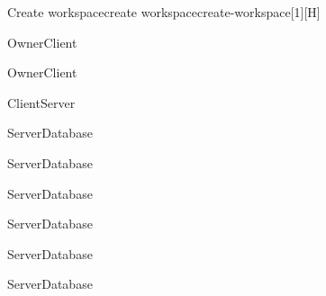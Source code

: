 \begin{sdfig}{Create workspace}{create workspace}{create-workspace}[1][H]

	\begin{seqdigauth}[Owner]
		\begin{umlcall}[op={Create workspace},return={Redirect to workspace creation}]{Owner}{Client}
		\end{umlcall}
		\begin{umlcall}[op={Submit name}]{Owner}{Client}
			\begin{umlcall}[op={Create workspace},return=Ok]{Client}{Server}
				\begin{umlcall}[op={Create project}]{Server}{Database}
					\begin{umlcall}[op={Create collection}]{Server}{Database}
						\begin{umlcall}[op={Create field}]{Server}{Database}
						\end{umlcall}
						\begin{umlcall}[op={Create view}]{Server}{Database}
						\end{umlcall}
						\begin{umlcall}[op={Create document}]{Server}{Database}
							\begin{umlcall}[op={Create block}]{Server}{Database}
							\end{umlcall}
						\end{umlcall}
					\end{umlcall}
				\end{umlcall}
			\end{umlcall}
		\end{umlcall}
	\end{seqdigauth}
\end{sdfig}

